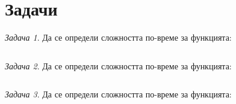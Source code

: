 \documentclass{article}
\theoremstyle{definition}
\theoremstyle{plain}
\theoremstyle{remark}
\newtheorem{problem}{Задача}
\theoremstyle{definition}
\begin{document}
\section*{Задачи}

\begin{problem}
Да се определи сложността по-време за функцията:
\inputminted[linenos]{c++}{algorithms/task1.cpp}
\end{problem}

\begin{problem}
Да се определи сложността по-време за функцията:
\inputminted[linenos]{c++}{algorithms/task2.cpp}
\end{problem}

\begin{problem}
Да се определи сложността по-време за функцията:
\inputminted[linenos]{c++}{algorithms/task3.cpp}
\end{problem}
\end{document}
